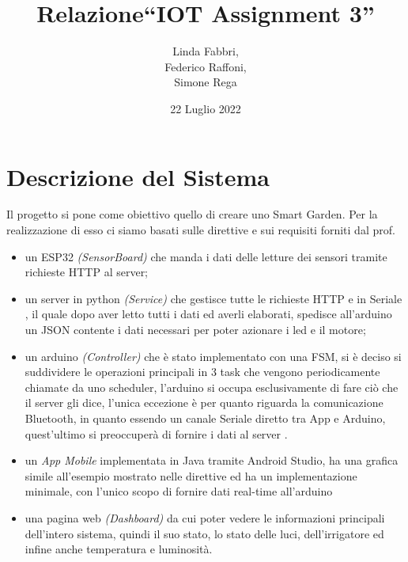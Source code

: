 \documentclass[a4paper,12pt]{report}
\title{Relazione\break``IOT Assignment 3''}
\author{Linda Fabbri, \\ Federico Raffoni,\\ Simone Rega}
\date{22 Luglio 2022}
\begin{document}
	\maketitle
	\tableofcontents
	
	\chapter{Descrizione del Sistema}
		Il progetto si pone come obiettivo quello di creare uno Smart Garden.
		Per la realizzazione di esso ci siamo basati sulle direttive e sui requisiti forniti dal prof.
	\begin{itemize}
		\item 	un ESP32 \textit{(SensorBoard)} che manda i dati delle letture dei sensori tramite richieste HTTP al server;
		\item  un server in python \textit{(Service)} che gestisce tutte le richieste HTTP e in Seriale , il quale dopo aver letto tutti i dati ed averli elaborati, spedisce all'arduino un JSON contente i dati necessari per poter azionare i led e il motore;
		\item un arduino \textit{(Controller)} che è stato implementato con una FSM, si è deciso si suddividere le operazioni principali in 3 task che vengono periodicamente chiamate da uno scheduler, l'arduino si occupa esclusivamente di  fare ciò che il server gli dice, l'unica eccezione è per quanto riguarda la comunicazione Bluetooth, in quanto essendo un canale Seriale diretto tra App e Arduino, quest'ultimo si preoccuperà di fornire i dati al server .
		\item 	un \textit{App Mobile} implementata in Java tramite Android Studio, ha una grafica simile all'esempio mostrato nelle direttive ed ha un implementazione minimale, con l'unico scopo di fornire dati real-time all'arduino
		\item una pagina web \textit{(Dashboard)} da cui poter vedere le informazioni principali dell'intero sistema, quindi il suo stato, lo stato delle luci, dell'irrigatore ed infine anche temperatura e luminosità.
	\end{itemize}
\end{document}
